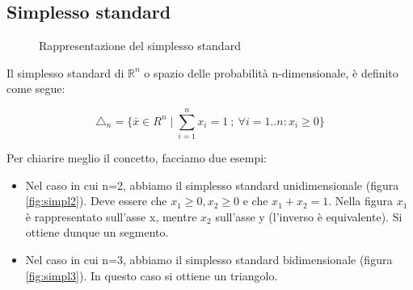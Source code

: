 \subsection{Simplesso standard}

\begin{figure}[htbp]
  \centering
  \caption{Rappresentazione del simplesso standard}
  \label{fig:animals}
\end{figure}

Il simplesso standard di $\mathbb{R}^n$ o spazio delle probabilità n-dimensionale, è definito come segue:
\begin{definizione}

 \[ \triangle_n = \{ \bar{x} \in R^n \mid \sum_{i=1}^{n} x_i=1 \ ; \ \forall i=1..n: x_i \ge 0 \} \]
\end{definizione}

Per chiarire meglio il concetto, facciamo due esempi:
\begin{itemize}
 \item Nel caso in cui n=2, abbiamo il simplesso standard unidimensionale (figura \ref{fig:simpl2}).
       Deve essere che $x_1 \ge 0, x_2 \ge 0$ e che $x_1+x_2=1$. Nella figura $x_1$ è rappresentato 
       sull'asse x, mentre $x_2$ sull'asse y (l'inverso è equivalente).
       Si ottiene dunque un segmento.
 \item Nel caso in cui n=3, abbiamo il simplesso standard bidimensionale (figura \ref{fig:simpl3}).
       In questo caso si ottiene un triangolo.
\end{itemize}





